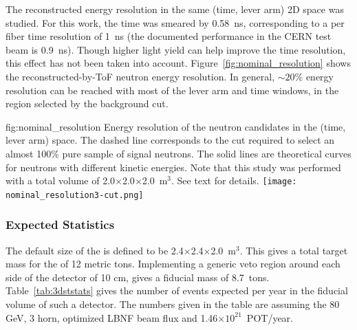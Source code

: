The reconstructed energy resolution in the same (time, lever arm) 2D space was studied. For this work, the time was smeared by 0.58~ns, corresponding to a per fiber time resolution of 1~ns (the documented performance in the CERN test beam is 0.9~ns).
Though higher light yield can help improve the time resolution, this effect has not been taken into account. Figure~\ref{fig:nominal_resolution} shows the reconstructed-by-ToF neutron energy resolution. In general, $\sim 20 \%$ energy resolution can be reached with most of the lever arm and time windows, 
in the region selected by the background cut. \\
\begin{dunefigure}{fig:nominal_resolution}
{Energy resolution of the neutron candidates in the (time, lever arm) space. 
The dashed line corresponds to the cut required to select an almost 100\% pure sample of signal neutrons. The solid lines are theoretical curves for neutrons with different kinetic energies.
Note that this study was performed with a total volume of 2.0$\times$2.0$\times$2.0~m$^3$.
See text for details.}
  \texttt{[image: nominal\_resolution3-cut.png]}
\end{dunefigure}

\subsubsection{Expected Statistics}


The default size of the  is defined to be 2.4$\times$2.4$\times$2.0~m$^{3}$. This gives a total target mass for the  of 12 metric tons.  Implementing a generic veto region around each side of the detector of 10 cm, gives a fiducial mass of 8.7~tons.
Table~\ref{tab:3dststats} gives the number of events expected per year in the fiducial volume of such a  detector.  The numbers given in the table are assuming the 80 GeV, 3 horn, optimized LBNF beam flux and 1.46$\times10^{21}$~POT/year.

